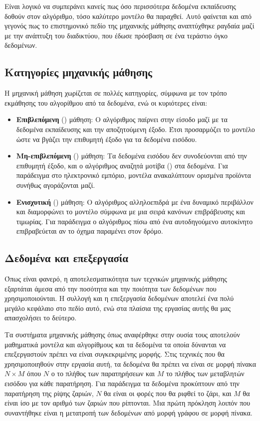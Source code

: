 Είναι λογικό να συμπεράνει κανείς πως όσο περισσότερα δεδομένα εκπαίδευσης δοθούν στον 
αλγόριθμο, τόσο καλύτερο μοντέλο θα παραχθεί. Αυτό φαίνεται και από γεγονός πως το 
επιστημονικό πεδίο της μηχανικής μάθησης αναπτύχθηκε ραγδαία μαζί με την ανάπτυξη του
διαδικτύου, που έδωσε πρόσβαση σε ένα τεράστιο όγκο δεδομένων.

\subsection{Κατηγορίες μηχανικής μάθησης}

Η μηχανική μάθηση χωρίζεται σε πολλές κατηγορίες, σύμφωνα με τον τρόπο εκμάθησης 
του αλγορίθμου από τα δεδομένα, ενώ οι κυριότερες είναι:

\begin{itemize}
    \item \textbf{Επιβλεπόμενη} () μάθηση: Ο αλγόριθμος παίρνει στην είσοδο
    μαζί με τα δεδομένα εκπαίδευσης και την αποζητούμενη έξοδο. Έτσι προσαρμόζει το μοντέλο
    ώστε να βγάζει την επιθυμητή έξοδο για τα δεδομένα εισόδου.
    \item \textbf{Μη-επιβλεπόμενη} () μάθηση: Τα δεδομένα εισόδου δεν
    συνοδεύονται από την επιθυμητή έξοδο, και ο αλγόριθμος αναζητά μοτίβα ()
    στα δεδομένα. Για παράδειγμα στο ηλεκτρονικό εμπόριο, μοντέλα ανακαλύπτουν ορισμένα
    προϊόντα συνήθως αγοράζονται μαζί.
    \item \textbf{Ενισχυτική} ()
    μάθηση: Ο αλγόριθμος αλληλοεπιδρά 
    με ένα δυναμικό περιβάλλον και διαμορφώνει το μοντέλο σύμφωνα με μια σειρά κανόνων
    επιβράβευσης και τιμωρίας. Για παράδειγμα ο αλγόριθμος πίσω από ένα 
    αυτοδηγούμενο αυτοκίνητο επιβραβεύεται αν το όχημα παραμένει στον δρόμο.
\end{itemize}


\subsection{Δεδομένα και επεξεργασία} \label{Δεδομένα και επεξεργασία}

Όπως είναι φανερό, η αποτελεσματικότητα των τεχνικών μηχανικής μάθησης εξαρτάται άμεσα
από την ποσότητα και την ποιότητα των δεδομένων που χρησιμοποιούνται. Η συλλογή και η 
επεξεργασία δεδομένων αποτελεί ένα πολύ μεγάλο κεφάλαιο στο πεδίο αυτό, ενώ στα πλαίσια της 
εργασίας αυτής θα μας απασχολήσει το δεύτερο. 

Τα συστήματα μηχανικής μάθησης όπως αναφέρθηκε στην ουσία τους αποτελούν μαθηματικά μοντέλα
και αλγορίθμους και τα δεδομένα τα οποία δύνανται να επεξεργαστούν πρέπει να είναι 
συγκεκριμένης μορφής. Στις τεχνικές που θα χρησιμοποιηθούν στην εργασία αυτή, τα
δεδομένα θα πρέπει να είναι σε μορφή πίνακα \(N \times M\) όπου \(N\) ο το πλήθος των
παρατηρήσεων και \(M\) το πλήθος των μεταβλητών εισόδου για κάθε παρατήρηση. Για παράδειγμα
τα δεδομένα προκύπτουν από την παρατήρηση της ρίψης ζαριών, \(N\) θα είναι οι φορές
που θα ριφθεί το ζάρι, και \(M\) θα είναι ίσο με τον αριθμό των ζαριών που ρίπτονται.
Μια πρώτη πρόκληση λοιπόν που συναντήθηκε είναι η μετατροπή των δεδομένων από μορφή
γράφου σε μορφή πίνακα. 


